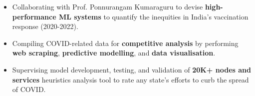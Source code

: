 \documentclass[10pt,a4paper,ragged2e,withhyper]{freycv}
\begin{document}

\makecvheader



\begin{paracol}{1}

        
	
	
	\begin{itemize}
		\item Collaborating with Prof. Ponnurangam Kumaraguru to devise \textbf{high-performance ML systems} to quantify the inequities in India's vaccination response (2020-2022)\href{https://arxiv.org/abs/2202.04433}{\faExternalLink*}.
		\item Compiling COVID-related data for \textbf{competitive analysis} by performing \textbf{web scraping}, \textbf{predictive modelling}, and \textbf{data visualisation}.
		\item Supervising model development, testing, and validation of \textbf{20K+ nodes and services} heuristics analysis tool to rate any state's efforts to curb the spread of COVID.
	\end{itemize}
	
	\medskip
	

\end{paracol}
\end{document}
